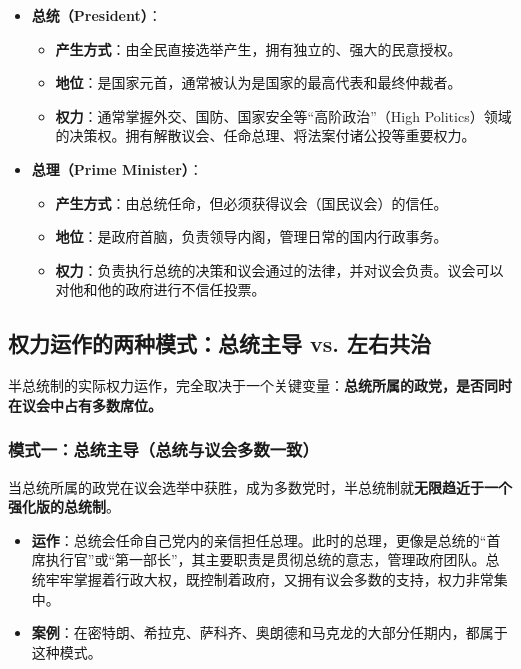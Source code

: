 \begin{itemize}
    \item \textbf{总统（President）}：
    \begin{itemize}
        \item \textbf{产生方式}：由全民直接选举产生，拥有独立的、强大的民意授权。
        \item \textbf{地位}：是国家元首，通常被认为是国家的最高代表和最终仲裁者。
        \item \textbf{权力}：通常掌握外交、国防、国家安全等“高阶政治”（High Politics）领域的决策权。拥有解散议会、任命总理、将法案付诸公投等重要权力。
    \end{itemize}
    \item \textbf{总理（Prime Minister）}：
    \begin{itemize}
        \item \textbf{产生方式}：由总统任命，但必须获得议会（国民议会）的信任。
        \item \textbf{地位}：是政府首脑，负责领导内阁，管理日常的国内行政事务。
        \item \textbf{权力}：负责执行总统的决策和议会通过的法律，并对议会负责。议会可以对他和他的政府进行不信任投票。
    \end{itemize}
\end{itemize}

\subsection{权力运作的两种模式：总统主导 vs. 左右共治}

半总统制的实际权力运作，完全取决于一个关键变量：\textbf{总统所属的政党，是否同时在议会中占有多数席位。}

\subsubsection*{模式一：总统主导（总统与议会多数一致）}

当总统所属的政党在议会选举中获胜，成为多数党时，半总统制就\textbf{无限趋近于一个强化版的总统制}。
\begin{itemize}
    \item \textbf{运作}：总统会任命自己党内的亲信担任总理。此时的总理，更像是总统的“首席执行官”或“第一部长”，其主要职责是贯彻总统的意志，管理政府团队。总统牢牢掌握着行政大权，既控制着政府，又拥有议会多数的支持，权力非常集中。
    \item \textbf{案例}：在密特朗、希拉克、萨科齐、奥朗德和马克龙的大部分任期内，都属于这种模式。
\end{itemize}

